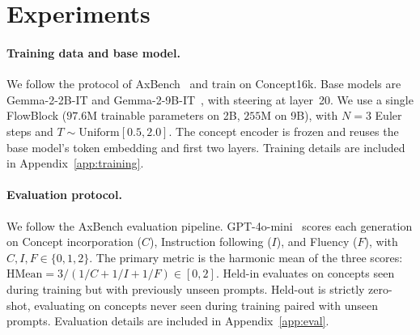 \documentclass{article}
\begin{document}
\section{Experiments}
\label{sec:experiments}

\paragraph{Training data and base model.}

We follow the protocol of AxBench~\citep{Wu2025} and train on Concept16k. Base models are Gemma-2-2B-IT and Gemma-2-9B-IT~\citep{Team2024}, with steering at layer~20. We use a single FlowBlock ($97.6$M trainable parameters on 2B, $255$M on 9B), with $N\!=\!3$ Euler steps and $T \sim \text{Uniform}[0.5, 2.0]$. The concept encoder is frozen and reuses the base model's token embedding and first two layers. Training details are included in Appendix~\ref{app:training}.

\paragraph{Evaluation protocol.}
We follow the AxBench evaluation pipeline. GPT-4o-mini~\citep{OpenAI2024} scores each generation on Concept incorporation ($C$), Instruction following ($I$), and Fluency ($F$), with $C, I, F \in \{0,1,2\}$. The primary metric is the harmonic mean of the three scores: $\text{HMean} = 3/(1/C + 1/I + 1/F) \in [0, 2]$. Held-in evaluates on concepts seen during training but with previously unseen prompts. Held-out is strictly zero-shot, evaluating on concepts never seen during training paired with unseen prompts. Evaluation details are included in Appendix~\ref{app:eval}.
\end{document}
